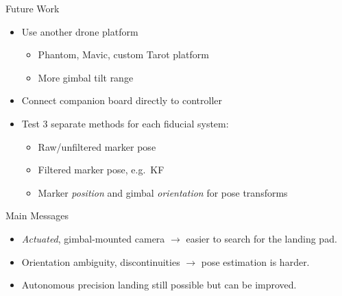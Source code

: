 \documentclass[aspectratio=169]{beamer}
\newif\ifpause
\newcommand{\mypause}{\ifpause \pause \fi}
\begin{document}
\begin{frame}{Future Work}
	\begin{itemize}
		\item Use another drone platform\mypause
		\begin{itemize}
			\item Phantom, Mavic, custom Tarot platform
			\item More gimbal tilt range\mypause
		\end{itemize}
		\item Connect companion board directly to controller
			\mypause
		\item Test 3 separate methods for each fiducial system:
		\begin{itemize}
			\item Raw/unfiltered marker pose
				\mypause
			\item Filtered marker pose, e.g.~KF
				\mypause
			\item Marker \emph{position} and gimbal \emph{orientation} for pose transforms
		\end{itemize}
	\end{itemize}
\end{frame}

\begin{frame}{Main Messages}
	\begin{itemize}
		\item \emph{Actuated}, gimbal-mounted camera
			$\rightarrow$ easier to search for the landing pad.
		\mypause\item Orientation ambiguity, discontinuities
			$\rightarrow$ pose estimation is harder.
		\mypause\item Autonomous precision landing still possible
			but can be improved.
	\end{itemize}
\end{frame}


\begin{frame}{}
\end{frame}
\end{document}
